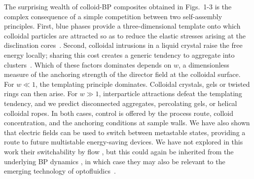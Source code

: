 \documentclass[12pt]{article}
\begin{document}
The surprising wealth of colloid-BP composites obtained in Figs.~1-3 is the complex consequence of a simple competition between two self-assembly principles. 
First, blue phases provide a three-dimensional template onto which colloidal particles are attracted so as to reduce the elastic stresses arising at the disclination cores~\cite{miha}. Second, colloidal intrusions in a liquid crystal raise the free energy locally; sharing this cost creates a generic tendency to aggregate into clusters~\cite{tiffany}. Which of these factors dominates depends on $w$, a dimensionless measure of the anchoring strength of the director field at the colloidal surface. For $w\ll 1$, the templating principle dominates. Colloidal crystals, gels or twisted rings can then arise. For $w \gg 1$, interparticle attractions defeat the templating tendency, and we predict disconnected aggregates, percolating gels, or helical colloidal ropes. In both cases, control is offered by the process route, colloid concentration, and the anchoring conditions at sample walls. We have also shown that electric fields can be used to switch between metastable states, providing a route to future multistable energy-saving devices. 
We have not explored in this work their switchability by flow \cite{flowswitch}, but this could again be inherited from the underlying BP dynamics \cite{adriano,permeation2}, in which case they may also be relevant to the emerging technology of optofluidics~\cite{optofluidics}.
\end{document}
